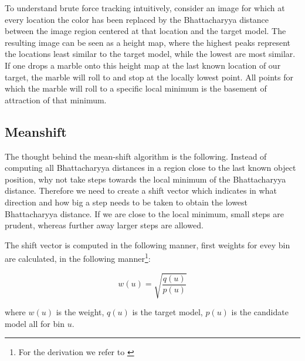 \documentclass[a4paper,11pt]{article}
\begin{document}
To understand brute force tracking intuitively, consider an image for which at every location the color has been replaced by the Bhattacharyya distance between the image region centered at that location and the target model. The resulting image can be seen as a height map, where the highest peaks represent the locations least similar to the target model, while the lowest are most similar. If one drops a marble onto this height map at the last known location of our target, the marble will roll to and stop at the locally lowest point. All points for which the marble will roll to a specific local minimum is the basement of attraction of that minimum. 

\subsection{Meanshift}

The thought behind the mean-shift algorithm is the following. Instead of computing all Bhattacharyya distances in a region close to the last known object position, why not take steps towards the local minimum of the Bhattacharyya distance. Therefore we need to create a shift vector which indicates in what direction and how big a step needs to be taken to obtain the lowest Bhattacharyya distance. If we are close to the local minimum, small steps are prudent, whereas further away larger steps are allowed. 



The shift vector is computed in the following manner, first weights for evey bin are calculated, in the following manner\footnote{For the derivation we refer to \cite{mean_shift}\label{fn:derivation_refer}}:



\begin{equation}

\label{eq:weights}

w(u) = \sqrt{\frac{q(u)}{p(u)}}

\end{equation} %

where $w(u)$ is the weight, $q(u)$ is the target model, $p(u)$ is the candidate model all for bin $u$.
\end{document}
